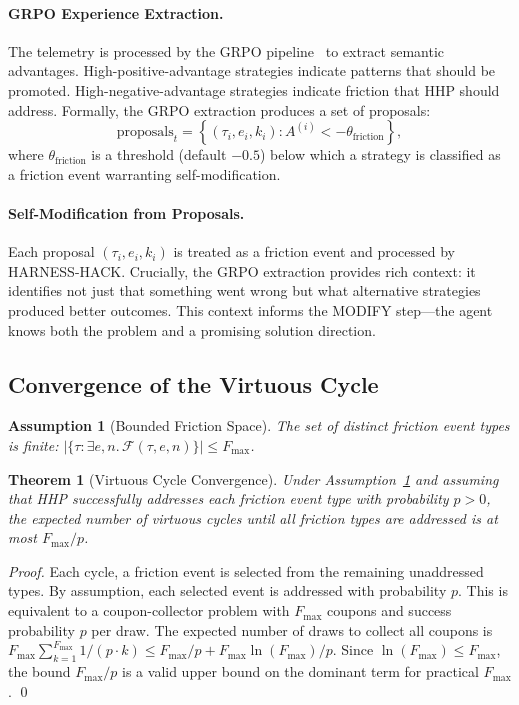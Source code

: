 \documentclass[11pt]{article}
\newtheorem{theorem}{Theorem}
\newtheorem{assumption}{Assumption}
\begin{document}
\paragraph{GRPO Experience Extraction.}
The telemetry is processed by the GRPO pipeline~\cite{hanzo2026aso} to extract
semantic advantages. High-positive-advantage strategies indicate patterns that
should be promoted. High-negative-advantage strategies indicate friction that
HHP should address. Formally, the GRPO extraction produces a set of proposals:
\begin{equation}
    \text{proposals}_t = \left\{(\tau_i, e_i, k_i) : A^{(i)} < -\theta_{\text{friction}}\right\},
\end{equation}
where $\theta_{\text{friction}}$ is a threshold (default $-0.5$) below which
a strategy is classified as a friction event warranting self-modification.

\paragraph{Self-Modification from Proposals.}
Each proposal $(\tau_i, e_i, k_i)$ is treated as a friction event and processed
by HARNESS-HACK. Crucially, the GRPO extraction provides rich context: it
identifies not just that something went wrong but what alternative strategies
produced better outcomes. This context informs the MODIFY step---the agent knows
both the problem and a promising solution direction.

\subsection{Convergence of the Virtuous Cycle}
\label{sec:convergence}

\begin{assumption}[Bounded Friction Space]
\label{ass:bounded}
The set of distinct friction event types is finite: $|\{\tau : \exists e, n.\,
\mathcal{F}(\tau, e, n)\}| \leq F_{\max}$.
\end{assumption}

\begin{theorem}[Virtuous Cycle Convergence]
\label{thm:convergence}
Under Assumption~\ref{ass:bounded} and assuming that HHP successfully addresses
each friction event type with probability $p > 0$, the expected number of
virtuous cycles until all friction types are addressed is at most
$F_{\max} / p$.
\end{theorem}

\begin{proof}
Each cycle, a friction event is selected from the remaining unaddressed types.
By assumption, each selected event is addressed with probability $p$. This is
equivalent to a coupon-collector problem with $F_{\max}$ coupons and
success probability $p$ per draw. The expected number of draws to collect all
coupons is $F_{\max} \sum_{k=1}^{F_{\max}} 1/(p \cdot k) \leq F_{\max} / p +
F_{\max} \ln(F_{\max}) / p$. Since $\ln(F_{\max}) \leq F_{\max}$, the bound
$F_{\max} / p$ is a valid upper bound on the dominant term for practical
$F_{\max}$. \qed
\end{proof}
\end{document}
